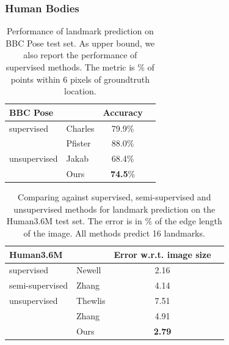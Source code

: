 		\begin{frame}[t]
		\frametitle{Human Bodies}
				\begin{table}[htp]
					\caption{{
					Performance of landmark prediction on BBC Pose test set. As upper bound, we also report the performance of supervised methods.
					The metric is \% of points within 6 pixels of groundtruth location. %
					}}
					\label{tab:bbcpose}
					\centering
					\begin{tabular}{ll|cr}
					\hline
					BBC Pose &   &    { Accuracy}  \\
					 \hline
					supervised & Charles \cite{charles13bbcpose} &
					   79.9\%  \\ %
					 & Pfister \cite{pfister15flowingconv}  &
					  88.0\%  \\ \hline %
					unsupervised &Jakab \cite{jakab18} &
					 68.4\%  \\  %
					  &Ours &  \textbf{74.5}\% \\
					\hline
					\end{tabular}
				\end{table}

				\begin{table}[htp]
					\caption{{Comparing against supervised, semi-supervised and unsupervised methods for landmark prediction on the Human3.6M test set. The
					error is in \% of the edge length of the image. All methods predict 16 landmarks.
					}}
					\label{tab:human}
					\centering
					\begin{tabular}{ll|cr}
					\hline
					 Human3.6M   & &  { Error w.r.t. image size}  \\
					 \hline
					 supervised & Newell \cite{newell16hourglass}
					  &2.16  \\  \hline
					 semi-supervised & Zhang \cite{zhang18}
					  & 4.14  \\ \hline
					 unsupervised & Thewlis \cite{thewlis17}
					 & 7.51  \\
					  & Zhang \cite{zhang18}
						& 4.91 \\
					  & Ours& \textbf{2.79} \\
					\hline
					\end{tabular}
				\end{table}
		\end{frame}

